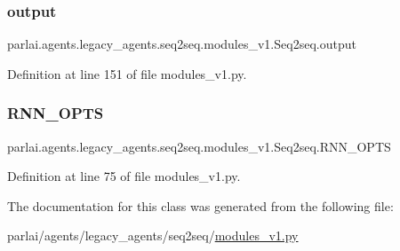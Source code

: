 \subsubsection{\texorpdfstring{output}{output}}
{\footnotesize\ttfamily parlai.\+agents.\+legacy\+\_\+agents.\+seq2seq.\+modules\+\_\+v1.\+Seq2seq.\+output}



Definition at line 151 of file modules\+\_\+v1.\+py.

\mbox{\label{classparlai_1_1agents_1_1legacy__agents_1_1seq2seq_1_1modules__v1_1_1Seq2seq_a5a00b62e3c2c6bad701f87d21f285f67}} 
\subsubsection{\texorpdfstring{R\+N\+N\+\_\+\+O\+P\+TS}{RNN\_OPTS}}
{\footnotesize\ttfamily parlai.\+agents.\+legacy\+\_\+agents.\+seq2seq.\+modules\+\_\+v1.\+Seq2seq.\+R\+N\+N\+\_\+\+O\+P\+TS\hspace{0.3cm}{\ttfamily [static]}}



Definition at line 75 of file modules\+\_\+v1.\+py.



The documentation for this class was generated from the following file\+:\begin{DoxyCompactItemize}
\item 
parlai/agents/legacy\+\_\+agents/seq2seq/\hyperlink{modules__v1_8py}{modules\+\_\+v1.\+py}\end{DoxyCompactItemize}
